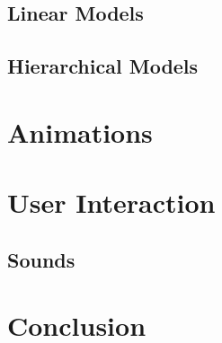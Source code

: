 \documentclass{article}
\begin{document}
\subsection{Linear Models} \label{linear}
\subsection{Hierarchical Models}
\section{Animations}
\section{User Interaction} \label{user}
\subsection{Sounds}
\section{Conclusion}
\end{document}

